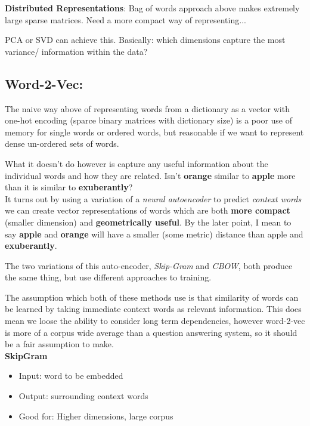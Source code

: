 \documentclass[]{article}
\begin{document}
      \textbf{Distributed Representations}: Bag of words approach above makes extremely large sparse matrices. Need a more compact way of representing...
     
     PCA or SVD can achieve this. Basically: which dimensions capture the most variance/ information within the data? \\
     
     \subsection{Word-2-Vec:}
     
     The naive way above of representing words from a dictionary as a vector with one-hot encoding (sparce binary matrices with dictionary size) is a poor use of memory for single words or ordered words, but reasonable if we want to represent dense un-ordered sets of words.
     
     What it doesn't do however is capture any useful information about the individual words and how they are related. Isn't \textbf{orange} similar to \textbf{apple} more than it is similar to \textbf{exuberantly}? \\
     
     It turns out by using a variation of a \textit{neural autoencoder} to predict \textit{context words} we can create vector representations of words which are both \textbf{more compact } (smaller dimension) and \textbf{geometrically useful}. By the later point, I mean to say \textbf{apple} and \textbf{orange} will have a smaller (some metric) distance than apple and \textbf{exuberantly}.
     
     The two variations of this auto-encoder, \textit{Skip-Gram} and \textit{CBOW}, both produce the same thing, but use different approaches to training.
     
     The assumption which both of these methods use is that similarity of words can be learned by taking immediate context words as relevant information. This does mean we loose the ability to consider long term dependencies, however word-2-vec is more of a corpus wide average than a question answering system, so it should be a fair assumption to make. \\
     
     \textbf{SkipGram}
     \begin{itemize}
      \item Input: word to be embedded
      \item Output: surrounding context words
      \item Good for: Higher dimensions, large corpus
     \end{itemize}
\end{document}
